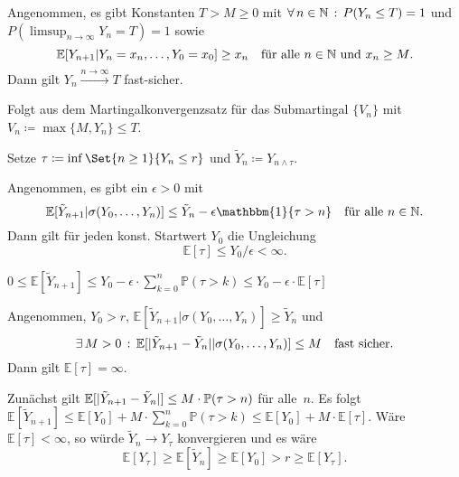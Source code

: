 \documentclass{cheat-sheet}
\renewcommand{\P}{\mathbb{P}} %
\newcommand{\E}{\mathbb{E}} %
\newcommand{\ind}{\mathbbm{1}} %
\begin{document}
\begin{satz}
  Angenommen, es gibt Konstanten $T > M \geq 0$ mit $\forall \, {n \in \mathbb{N}} \,:\, P(Y_n \leq T) = 1$ und $P({\limsup}_{n \to \infty} Y_n = T) = 1$ sowie
  \[
    \E[ Y_{n+1} | Y_n = x_n, \ldots, Y_0 = x_0 ] \geq x_n
    \quad \text{für alle $n \in \N$ und $x_n \geq M$.}
  \]
  Dann gilt $Y_n \xrightarrow{n \to \infty} T$ fast-sicher.
\end{satz}

\begin{beweisidee}
  Folgt aus dem Martingalkonvergenzsatz für das Submartingal $\{ V_n \}$ mit
  $V_n \coloneqq \max \{ M, Y_n \} \leq T$.
\end{beweisidee}

\begin{setting}
  Setze $\tau \coloneqq \inf \Set{n \geq 1}{Y_n \leq r}$ und $\tilde{Y}_n \coloneqq Y_{n \wedge \tau}$.
\end{setting}

\begin{satz}
  Angenommen, es gibt ein $\epsilon > 0$ mit
  \[
    \E[ \tilde{Y}_{n+1} | \sigma(Y_0, \ldots, Y_n) ] \leq \tilde{Y}_n - \epsilon \ind \{ \tau > n \}
    \quad \text{für alle $n \in \N$}.
  \]
  Dann gilt für jeden konst. Startwert $Y_0$ die Ungleichung
  \[ \E[\tau] \leq Y_0 / \epsilon < \infty. \]
\end{satz}

\begin{beweis}
  $0 \leq \E[ \tilde{Y}_{n+1} ] \leq Y_0 - \epsilon \cdot {\sum}_{k=0}^n \P(\tau > k) \leq Y_0 - \epsilon \cdot \E[\tau]$
\end{beweis}

\begin{satz}
  Angenommen, $Y_0 > r$, $\E[ \tilde{Y}_{n+1} | \sigma(Y_0, \ldots, Y_n) ] \geq \tilde{Y}_n$ und
  \[
    \ex{M > 0}
    \E[ \abs{\tilde{Y}_{n+1} - \tilde{Y}_n} | \sigma(Y_0, \ldots, Y_n) ] \leq M
    \quad \text{fast sicher}.
  \]
  Dann gilt $\E[ \tau ] = \infty$.
\end{satz}

\begin{beweisskizze}
  Zunächst gilt $\E[ \abs{\tilde{Y}_{n+1} - \tilde{Y}_n} ] \leq M \cdot \P(\tau > n)$ für alle~$n$.
  Es folgt $\E[ \tilde{Y}_{n+1} ] \leq \E[ Y_0 ] + M \cdot {\sum}_{k=0}^n \P(\tau > k) \leq \E[ Y_0 ] + M \cdot \E[\tau]$.
  Wäre $\E[\tau] < \infty$, so würde $\tilde{Y}_n \to Y_\tau$ konvergieren und es wäre
  \[
    \E[Y_\tau] \geq \E[\tilde{Y}_n] \geq \E[Y_0] > r \geq \E[Y_\tau].
  \]
\end{beweisskizze}
\end{document}
